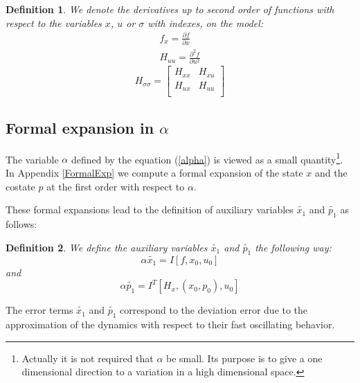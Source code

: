 \documentclass[a4paper,10pt]{article}
\newtheorem{definition}{Definition}
\begin{document}
\begin{definition}
    We denote the derivatives up to second order of functions with 
    respect to the variables 
    $x$, $u$ or $\sigma $ with indexes, on the model: 
    \begin{align*}
        f_{x}  =  \frac{\partial f}{\partial x} \\
	H_{uu}  =  \frac{\partial^{2} f}{\partial u^{2}} 
    \end{align*}
 \[
             H_{\sigma \sigma}  =
            \left[ \begin{array}
             {cc}
                 
                H_{xx}  & H_{xu}   \\
                 
                 H_{ux}  & H_{uu}   \\
                 
                  
             \end{array} \right]
 \]
 \end{definition}
 
 \subsection{Formal expansion in $\alpha$}
 The variable $\alpha$ defined by the equation (\ref{alpha}) is 
 viewed as a 
 small quantity\footnote{Actually it is not required that $\alpha$ be 
 small. Its purpose is to give a one dimensional direction to a 
 variation in a high dimensional space.}. In Appendix \ref{FormalExp} 
 we compute a formal expansion of the state $x$ and the costate $p$ 
 at the first order with respect to $\alpha$.
 
 These formal expansions lead to the definition of auxiliary 
 variables $\tilde{x_{1}}$ and $\tilde{p_{1}}$ as follows:
\begin{definition}\label{xpTilde1}
	We define the auxiliary variables $\tilde{x_{1}}$ and 
	$\tilde{p_{1}}$ the following way:
	\begin{equation}\label{xtilde1}
		\alpha \tilde{x_{1}} =  I[f,x_{0},u_{0}]
	\end{equation}
	and
		\begin{equation*}
		\alpha \tilde{p_{1}} =  I^{T}[H_{x},(x_{0},p_{0}),u_{0}]
	\end{equation*}
\end{definition}

The error terms $\tilde{x_{1}}$ and $\tilde{p_{1}}$ correspond to the 
deviation error due to the approximation of the dynamics with respect 
to their fast oscillating behavior.
\end{document}
